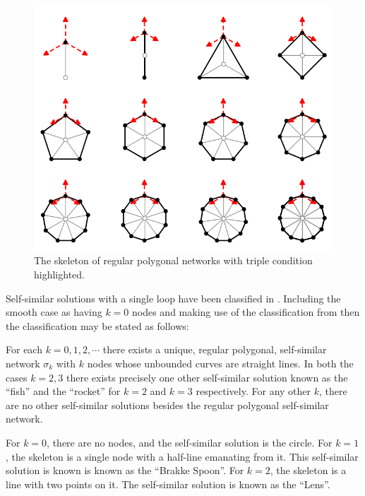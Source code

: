 \documentclass[11pt]{amsart}
\begin{document}
\begin{figure}[htb]
\centering
\includegraphics[width=.9\linewidth]{regularpolygon}
\caption{The skeleton of regular polygonal networks with triple condition highlighted.}
\label{fg:regularpolygon}
\end{figure}

Self-similar solutions with a single loop have been classified in \cite{MR2340176}. Including the smooth case as having \(k=0\) nodes and making use of the classification from \cite{MR845704} then the classification may be stated as follows:

\begin{theorem}[\cite{MR2340176,MR845704}]
For each \(k = 0, 1, 2, \cdots\) there exists a unique, regular polygonal, self-similar network \(\sigma_k\) with \(k\) nodes whose unbounded curves are straight lines. In both the cases \(k = 2,3\) there exists precisely one other self-similar solution known as the ``fish'' and the ``rocket'' for \(k = 2\) and \(k = 3\) respectively. For any other \(k\), there are no other self-similar solutions besides the regular polygonal self-similar network.
\end{theorem}

\begin{remark}
For \(k = 0\), there are no nodes, and the self-similar solution is the circle. For \(k = 1\), the skeleton is a single node with a half-line emanating from it. This self-similar solution is known is known as the ``Brakke Spoon''. For $k=2$, the skeleton is a line with two points on it. The self-similar solution is known as the ``Lens''.
\end{remark}
\end{document}
